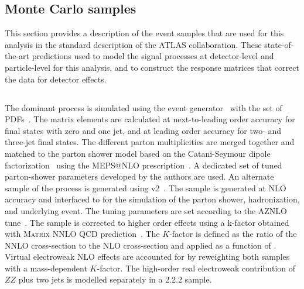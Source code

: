 \subsection{Monte Carlo samples}
\label{sec:montecarlopred}
This section provides a description of the event samples that are used for this analysis in the standard description of the ATLAS collaboration. These state-of-the-art predictions used to model the signal processes at detector-level and particle-level for this analysis, and to construct the response matrices that correct the data for detector effects. 
\subsection{\qqFourL}
The dominant \qqFourL process is simulated using the  event generator~\cite{Bothmann:2019yzt} with the \nnpdfnnlo{} set of PDFs~\cite{Ball:2014uwa}. The matrix elements are calculated at next-to-leading order accuracy for final states with zero and one jet, and at leading order accuracy for two- and three-jet final states. The different parton multiplicities are merged together and matched to the \SHERPA parton shower model based on the Catani-Seymour dipole factorization~\cite{Gleisberg:2008fv,Schumann:2007mg} using the MEPS@NLO prescription~\cite{Hoeche:2011fd,Catani:2001cc,Hoeche:2009r}. A dedicated set of tuned parton-shower parameters developed by the \SHERPA authors are used. 
An alternate sample of the \qqFourL process is generated using  \POWHEGBOX v2~\cite{Alioli:2010xd,Melia:2011tj,Nason:2013ydw}. The sample is generated at NLO accuracy and interfaced to  for the simulation of the parton shower, hadronization, and underlying event. The tuning parameters are set according to the AZNLO tune~\cite{STDM-2012-23}. The sample is corrected to higher order effects using a k-factor obtained with \textsc{Matrix} NNLO QCD prediction~\cite{Cascioli:2014yka,Grazzini:2015hta,Grazzini:2017mhc,Kallweit:2018nyv}. The $K$-factor is defined as the ratio of the NNLO cross-section to the NLO cross-section and applied as a function of \mFourL{}. 
Virtual electroweak NLO effects are accounted for by reweighting both samples with a mass-dependent $K$-factor. The high-order real electroweak contribution of $ZZ$ plus two jets is modelled separately in a \SHERPA{} {2.2.2} sample. 

